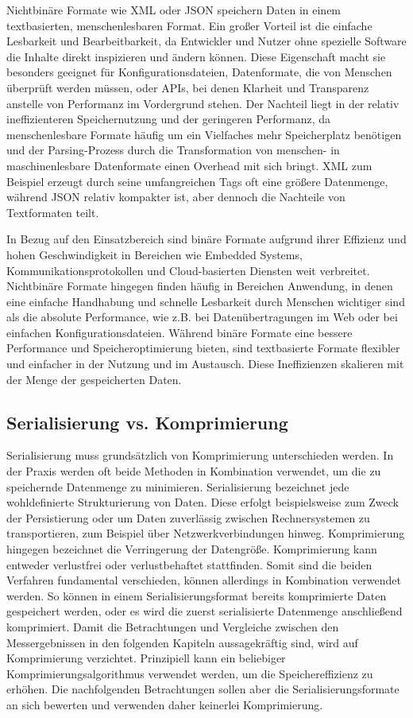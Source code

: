 \documentclass[ngerman]{seminarvorlage}
\begin{document}
Nichtbinäre Formate wie XML oder JSON speichern Daten in einem textbasierten, menschenlesbaren Format. Ein großer Vorteil ist die einfache Lesbarkeit und Bearbeitbarkeit, da Entwickler und Nutzer ohne spezielle Software die Inhalte direkt inspizieren und ändern können. Diese Eigenschaft macht sie besonders geeignet für Konfigurationsdateien, Datenformate, die von Menschen überprüft werden müssen, oder APIs, bei denen Klarheit und Transparenz anstelle von Performanz im Vordergrund stehen. Der Nachteil liegt in der relativ ineffizienteren Speichernutzung und der geringeren Performanz, da menschenlesbare Formate häufig um ein Vielfaches mehr Speicherplatz benötigen und der Parsing-Prozess durch die Transformation von menschen- in maschinenlesbare Datenformate einen Overhead mit sich bringt. XML zum Beispiel erzeugt durch seine umfangreichen Tags oft eine größere Datenmenge, während JSON relativ kompakter ist, aber dennoch die Nachteile von Textformaten teilt.

In Bezug auf den Einsatzbereich sind binäre Formate aufgrund ihrer Effizienz und hohen Geschwindigkeit in Bereichen wie Embedded Systems, Kommunikationsprotokollen und Cloud-basierten Diensten weit verbreitet. Nichtbinäre Formate hingegen finden häufig in Bereichen Anwendung, in denen eine einfache Handhabung und schnelle Lesbarkeit durch Menschen wichtiger sind als die absolute Performance, wie z.B. bei Datenübertragungen im Web oder bei einfachen Konfigurationsdateien. Während binäre Formate eine bessere Performance und Speicheroptimierung bieten, sind textbasierte Formate flexibler und einfacher in der Nutzung und im Austausch. Diese Ineffizienzen skalieren mit der Menge der gespeicherten Daten.
 
\subsection{Serialisierung vs. Komprimierung}

Serialisierung muss grundsätzlich von Komprimierung unterschieden werden. In der Praxis werden oft beide Methoden in Kombination verwendet, um die zu speichernde Datenmenge zu minimieren. Serialisierung bezeichnet jede wohldefinierte Strukturierung von Daten. Diese erfolgt beispielsweise zum Zweck der Persistierung oder um Daten zuverlässig zwischen Rechnersystemen zu transportieren, zum Beispiel über Netzwerkverbindungen hinweg. Komprimierung hingegen bezeichnet die Verringerung der Datengröße. Komprimierung kann entweder verlustfrei oder verlustbehaftet stattfinden. Somit sind die beiden Verfahren fundamental verschieden, können allerdings in Kombination verwendet werden. So können in einem Serialisierungsformat bereits komprimierte Daten gespeichert werden, oder es wird die zuerst serialisierte Datenmenge anschließend komprimiert. Damit die Betrachtungen und Vergleiche zwischen den Messergebnissen in den folgenden Kapiteln aussagekräftig sind, wird auf Komprimierung verzichtet. Prinzipiell kann ein beliebiger Komprimierungsalgorithmus verwendet werden, um die Speichereffizienz zu erhöhen. Die nachfolgenden Betrachtungen sollen aber die Serialisierungsformate an sich bewerten und verwenden daher keinerlei Komprimierung.
\end{document}
